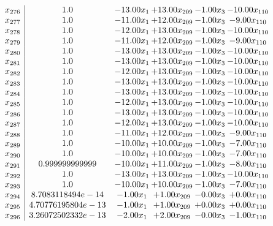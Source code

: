 \documentclass[8pt]{article}
\begin{document}
\[\begin{array}{c| c c@{\hskip 2pt} c@{\hskip 2pt} c@{\hskip 2pt} c@{\hskip 2pt} }
 x_{276}   &  1.0 & -13.00 x_{1} & + 13.00 x_{209} & -1.00 x_{3} & -10.00 x_{110}\\
 x_{277}   &  1.0 & -11.00 x_{1} & + 12.00 x_{209} & -1.00 x_{3} & -9.00 x_{110}\\
 x_{278}   &  1.0 & -12.00 x_{1} & + 13.00 x_{209} & -1.00 x_{3} & -10.00 x_{110}\\
 x_{279}   &  1.0 & -11.00 x_{1} & + 12.00 x_{209} & -1.00 x_{3} & -9.00 x_{110}\\
 x_{280}   &  1.0 & -13.00 x_{1} & + 13.00 x_{209} & -1.00 x_{3} & -10.00 x_{110}\\
 x_{281}   &  1.0 & -13.00 x_{1} & + 13.00 x_{209} & -1.00 x_{3} & -10.00 x_{110}\\
 x_{282}   &  1.0 & -12.00 x_{1} & + 13.00 x_{209} & -1.00 x_{3} & -10.00 x_{110}\\
 x_{283}   &  1.0 & -13.00 x_{1} & + 13.00 x_{209} & -1.00 x_{3} & -10.00 x_{110}\\
 x_{284}   &  1.0 & -13.00 x_{1} & + 13.00 x_{209} & -1.00 x_{3} & -10.00 x_{110}\\
 x_{285}   &  1.0 & -12.00 x_{1} & + 13.00 x_{209} & -1.00 x_{3} & -10.00 x_{110}\\
 x_{286}   &  1.0 & -13.00 x_{1} & + 13.00 x_{209} & -1.00 x_{3} & -10.00 x_{110}\\
 x_{287}   &  1.0 & -12.00 x_{1} & + 13.00 x_{209} & -1.00 x_{3} & -10.00 x_{110}\\
 x_{288}   &  1.0 & -11.00 x_{1} & + 12.00 x_{209} & -1.00 x_{3} & -9.00 x_{110}\\
 x_{289}   &  1.0 & -10.00 x_{1} & + 10.00 x_{209} & -1.00 x_{3} & -7.00 x_{110}\\
 x_{290}   &  1.0 & -10.00 x_{1} & + 10.00 x_{209} & -1.00 x_{3} & -7.00 x_{110}\\
 x_{291}   &  0.999999999999 & -10.00 x_{1} & + 11.00 x_{209} & -1.00 x_{3} & -8.00 x_{110}\\
 x_{292}   &  1.0 & -13.00 x_{1} & + 13.00 x_{209} & -1.00 x_{3} & -10.00 x_{110}\\
 x_{293}   &  1.0 & -10.00 x_{1} & + 10.00 x_{209} & -1.00 x_{3} & -7.00 x_{110}\\
 x_{294}   &  8.7083118494e-14 & -1.00 x_{1} & +  1.00 x_{209} & -0.00 x_{3} & +  0.00 x_{110}\\
 x_{295}   &  4.70776195804e-13 & -1.00 x_{1} & +  1.00 x_{209} & +  0.00 x_{3} & +  0.00 x_{110}\\
 x_{296}   &  3.26072502332e-13 & -2.00 x_{1} & +  2.00 x_{209} & -0.00 x_{3} & -1.00 x_{110}\\

\end{array}\]
\end{document}
